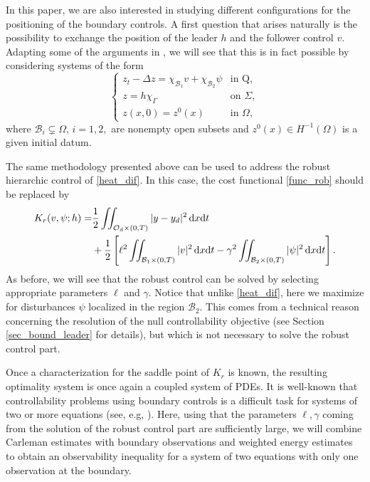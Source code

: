 \documentclass{aims}
\theoremstyle{definition}
\newcommand\csin[1]{\chi_{#1}}
\def\dx{\,\textnormal{d}x}
\def\dt{\textnormal{d}t}
\begin{document}
In this paper, we are also interested in studying different configurations for the positioning of the boundary controls. A first question that arises naturally is the possibility to exchange the position of the leader $h$ and the follower control $v$. Adapting some of the arguments in \cite{da_silva}, we will see that this is in fact possible by considering systems of the form 
%
\begin{equation}\label{heat_dif}
\begin{cases}
z_t-\Delta z=\csin{\mathcal B_1}v+\csin{\mathcal B_2}\psi & \text{in Q}, \\
z=h\csin{\Gamma} &\text{on } \Sigma, \\
z(x,0)=z^0(x) & \text{in } \Omega,
\end{cases}
\end{equation}
%
where {$\mathcal B_i \subsetneq \Omega$}, $i=1,2,$ are nonempty open subsets and ${z^0(x)\in H^{-1}(\Omega)}$ is a given initial datum. 

The same methodology presented above can be used to address the robust hierarchic control of \eqref{heat_dif}. In this case, the cost functional \eqref{func_rob} should be replaced by 
%
\begin{equation}\label{func_rob_dif}
\begin{split}
K_r(v,\psi;h)=&\frac{1}{2}\iint_{\mathcal O_d\times(0,T)}|y-y_d|^2\dx\dt\\
&+\frac{1}{2}\left[\ell^2\iint_{\mathcal B_1\times(0,T)}|v|^2\dx\dt-\gamma^2\iint_{\mathcal B_2\times(0,T)}|\psi|^2\dx\dt\right].
\end{split}
\end{equation}
%
As before, we will see that the robust control can be solved by selecting appropriate parameters $\ell$ and $\gamma$. Notice that unlike \eqref{heat_dif}, here we maximize for disturbances $\psi$ localized in the region $\mathcal B_2$. This comes from a technical reason concerning the resolution of the null controllability objective (see Section {\ref{sec_bound_leader}} for details), but which is not necessary to solve the robust control part. 

Once a characterization for the saddle point of $K_r$ is known, the resulting optimality system is once again a coupled system of PDEs. It is well-known that controllability problems using boundary controls is a difficult task for systems of two or more equations (see, e.g, \cite{assia_survey,assia_luz_new}). Here,  using that the parameters $\ell,\gamma$ coming from the solution of the robust control part are sufficiently large, we will combine Carleman estimates with boundary observations and weighted energy estimates to obtain an observability inequality for a system of two equations with only one observation at the boundary.
\end{document}
